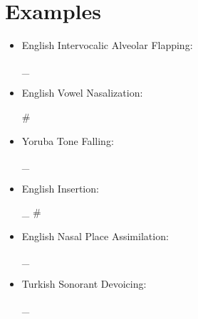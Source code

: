 \documentclass[11pt]{article}
\newcommand{\ipa}[1]{\textipa{#1}}
\newenvironment{phon_rule}{%
  \begin{center}
  \renewcommand\>{\ {\Large $\to$}\ }
  \renewcommand{\/}{{\Huge \ /\ }}
  \newcommand{\when}{\/}
  \renewcommand\_{\ $\rule{2em}{0.5pt}$\ }
  \renewcommand\null{{\Large $\emptyset$}\ \ }

  \newcommand{\phone}[1]{\ [\ \ipa{##1}\ ]\ }
  \newcommand{\phoneme}[1]{\ /\ \ipa{##1} /\ }

  \newcommand{\cv}[1]{{\Large \textrm{##1}}}
  \let\hash\# \renewcommand\#{ \cv{\hash} }

  \newcommand{\features}[1]{
    $\begin{array}[c][ {l} ]
      \vspace{-1px}
      ##1
    \end{array}$
  }
  \newcommand{\cvfeatures}[2]{
    $\begin{array}{c}
       \cv{##1} \\
       \begin{array}[c][ {l} ]
         \vspace{-1px}
         ##2
       \end{array}
    \end{array}$
  }
  \newcommand{\f}[2]{
    ##1\,\,\rm{##2} \\
  }

  \newcommand{\oneof}[1]{$\begin{cases} ##1 \end{cases}$}
}{%
  \end{center}
}
\begin{document}
\section*{Examples}

\begin{itemize}

\item English Intervocalic Alveolar Flapping:

\begin{phon_rule}
 \>  \/ 
 \_ 
\end{phon_rule}

\item English Vowel Nasalization:

\begin{phon_rule}
 \>  \/ 
  \#
\end{phon_rule}

\item Yoruba Tone Falling:

\begin{phon_rule}
 \>  \/
 \_
\end{phon_rule}

\item English \ipa{@} Insertion:

\begin{phon_rule}
\null \>  \/
 \_  \#
\end{phon_rule}

\item English Nasal Place Assimilation:

\begin{phon_rule}
 \>  \/
\_ 
\end{phon_rule}

\item Turkish Sonorant Devoicing:

\begin{phon_rule}
 \>  \/
\_ 
\end{phon_rule}

\end{itemize}
\end{document}
